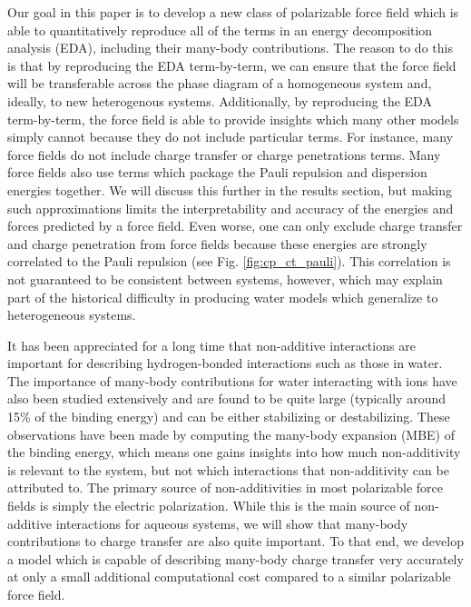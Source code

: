 \documentclass[journal=jacsat,manuscript=article]{achemso}
\begin{document}
Our goal in this paper is to develop a new class of polarizable
force field which is able to quantitatively reproduce all of the terms
in an energy decomposition analysis (EDA)\cite{horn2016probing,mao2021intermolecular},
including their many-body contributions. The reason to do this
is that by reproducing the EDA term-by-term, we can ensure that the force
field will be transferable across the phase diagram of a homogeneous
system and, ideally, to new heterogenous systems.
Additionally, by reproducing the EDA term-by-term, the force field
is able to provide insights which many other models simply cannot because
they do not include particular terms. For instance, many force fields
do not include charge transfer or charge penetrations terms.
Many force fields also use terms which package the Pauli repulsion and dispersion 
energies together. We will discuss this further in the results section,
but making such approximations limits the interpretability and accuracy of the
energies and forces predicted by a force field. Even worse, one can only
exclude charge transfer and charge penetration from force fields because
these energies are strongly correlated to the Pauli repulsion (see Fig. \ref{fig:cp_ct_pauli}).
This correlation is not guaranteed to be consistent between systems, however,
which may explain part of the historical difficulty in producing water models which
generalize to heterogeneous systems.

It has been appreciated for a long time that non-additive interactions are
important for describing hydrogen-bonded interactions such as those in water.\cite{xantheas2000cooperativity}
The importance of many-body contributions for water interacting with ions have
also been studied extensively and are found to be quite large (typically around 15\% of the binding energy)
and can be either stabilizing or destabilizing.\cite{heindel2021many,herman2021many}
These observations have been made by computing the many-body expansion (MBE) of
the binding energy\cite{heindel2020many}, which means one gains insights into how much non-additivity
is relevant to the system, but not which interactions that non-additivity can be
attributed to. The primary source of non-additivities in most polarizable force fields
is simply the electric polarization. While this is the main source of non-additive
interactions for aqueous systems, we will show that many-body contributions to charge
transfer are also quite important. To that end, we develop a model which is capable
of describing many-body charge transfer very accurately at only a small additional
computational cost compared to a similar polarizable force field.
\end{document}
